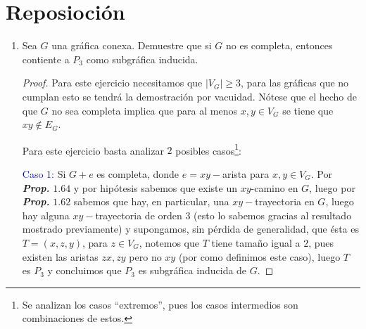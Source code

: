 \documentclass{article}
\begin{document}
\section*{\LARGE{Reposioción}}
\begin{enumerate}
\item {} Sea $G$ una gr\'afica conexa. Demuestre
  que si $G$ no es completa, entonces contiente a $P_3$ como subgr\'afica inducida.
    \renewcommand\qedsymbol{QED}
  \begin{proof} Para este ejercicio necesitamos que $|V_G| \geq 3$, para las
    gr\'aficas que no cumplan esto se tendr\'a la demostraci\'on por vacuidad.
    Nótese que el hecho de que $G$ no sea completa implica que para al
    menos $x,y \in V_G$ se tiene que $xy \notin E_G$.

        \begin{center}
    \end{center}

    Para este ejercicio basta analizar $2$ posibles casos\footnote{Se
      analizan los casos ``extremos'', pues los casos intermedios son combinaciones
      de estos.}:

    \textcolor{blue}{Caso 1:} Si $G + e$ es completa, donde $e = xy-$arista para
    $x,y \in V_G$. Por \textbf{\textit{Prop.}} $\mathbf{1.64}$ y por hipótesis
    sabemos que existe un $xy$-camino en $G$, luego por \textbf{\textit{Prop.}}
    $\mathbf{1.62}$ sabemos que hay, en particular, una $xy-$trayectoria en $G$,
    luego hay alguna $xy-$trayectoria de orden $3$ (esto lo sabemos gracias al
    resultado mostrado previamente) y supongamos, sin p\'erdida de generalidad,
    que \'esta es $T = (x,z,y)$, para $z \in V_G$, notemos que $T$ tiene tamaño
    igual a $2$, pues existen las aristas $zx, zy$ pero no $xy$ (por como definimos
    este caso), luego $T$ es $P_3$ y concluimos que $P_3$ es subgr\'afica inducida
    de $G$.


\end{proof}
\end{enumerate}
\end{document}
